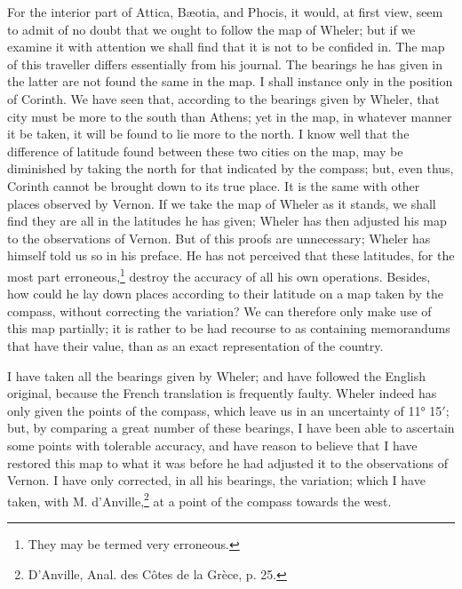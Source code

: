 \documentclass[a4paper, 11pt, oneside, polutonikogreek, english]{article}
\begin{document}
For the interior part of Attica, Bæotia, and Phocis, it would, at first view, seem to admit of no doubt that we ought to follow the map of Wheler; but if we examine it with attention we shall find that it is not to be confided in. The map of this traveller differs essentially from his journal. The bearings he has given in the latter are not found the same in the map. I shall instance only in the position of Corinth. We have seen that, according to the bearings given by Wheler, that city must be more to the south than Athens; yet in the map, in whatever manner it be taken, it will be found to lie more to the north. I know well that the difference of latitude found between these two cities on the map, may be diminished by taking the north for that indicated by the compass; but, even thus, Corinth cannot be brought down to its true place. It is the same with other places observed by Vernon. If we take the map of Wheler as it stands, we shall find they are all in the latitudes he has given; Wheler has then adjusted his map to the observations of Vernon. But of this proofs are unnecessary; Wheler has himself told us so in his preface. He has not perceived that these latitudes, for the most part erroneous,\footnote{They may be termed very erroneous.} destroy the accuracy of all his own operations. Besides, how could he lay down places according to their latitude on a map taken by the compass, without correcting the variation? We can therefore only make use of this map partially; it is rather to be had recourse to as containing memorandums that have their value, than as an exact representation of the country.

I have taken all the bearings given by Wheler; and have followed the English original, because the French translation is frequently faulty. Wheler indeed has only given the points of the compass, which leave us in an uncertainty of 11° 15$'$; but, by comparing a great number of these bearings, I have been able to ascertain some points with tolerable accuracy, and have reason to believe that I have restored this map to what it was before he had adjusted it to the observations of Vernon. I have only corrected, in all his bearings, the variation; which I have taken, with M. d'Anville,\footnote{D'Anville, Anal. des Côtes de la Grèce, p. 25.} at a point of the compass towards the west.
\end{document}
